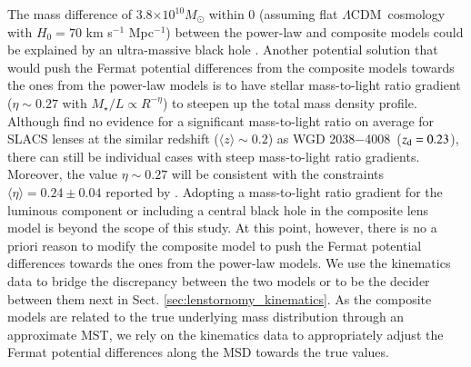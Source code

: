 \documentclass[longauth]{aa}
\newcommand{\lensname}{WGD 2038$-$4008}
\newcommand{\lcdm}{$\Lambda$CDM}
\newcommand{\ajs}[1]{{{#1}}}
\newcommand{\ajsii}[1]{{{#1}}}
\newcommand{\ajsiv}[1]{{{#1}}}
\begin{document}
\ajs{\ajsii{The mass difference of 3.8$\times10^{10} M_{\odot}$ within 0\farcs2  (assuming flat \lcdm\ cosmology with $H_0=70$ km s$^{-1}$ Mpc$^{-1}$) between the power-law and composite models \ajsiv{could} be explained by an ultra-massive black hole \citep[e.g.][]{Mehrgan19, Dullo19}.} Another potential solution that would push the Fermat potential differences from the composite models towards the ones from the power-law models is to have stellar mass-to-light ratio gradient \ajsii{($\eta \sim 0.27$ with $M_{\star}/L \propto R^{-\eta}$)} to steepen up the total mass density profile. Although \citet{Shajib21} find no evidence for a significant mass-to-light ratio {on average} for SLACS lenses at the similar redshift ($\langle z \rangle \sim 0.2$) as \lensname\ ($z_{\rm d} = 0.23$), there can still be individual cases with steep mass-to-light ratio gradients. \ajsii{Moreover, the value $\eta \sim 0.27$ will be consistent with the constraints $\langle \eta \rangle = 0.24 \pm 0.04$ reported by \citet{Sonnenfeld18c}.} Adopting a mass-to-light ratio gradient for the luminous component or including a central black hole in the composite lens model is beyond the scope of this study. At this point, however, there is no {a priori} reason to modify the composite model to push the Fermat potential differences towards the ones from the power-law models. We use the kinematics data to bridge the discrepancy between the two models or to be the decider between them next in Sect. \ref{sec:lenstornomy_kinematics}. As the composite models are related to the true underlying mass distribution through an approximate MST, we rely on the kinematics data to appropriately adjust the Fermat potential differences along the MSD towards the true values.}


\end{document}

